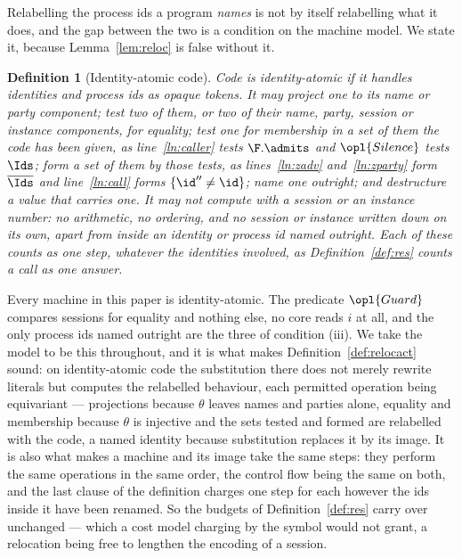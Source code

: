 \documentclass[10pt,oneside,openany]{book}
\theoremstyle{accentdef}
\newtheorem{definition}{Definition}[chapter]
\theoremstyle{accentplain}
\begin{document}
Relabelling the process ids a program \emph{names} is not by itself relabelling what it does, and
the gap between the two is a condition on the machine model. We state it, because
Lemma~\ref{lem:reloc} is false without it.

\begin{definition}[Identity-atomic code]\label{def:atomic}
Code is \emph{identity-atomic} if it handles identities and process ids as opaque tokens. It may
project one to its name or party component; test two of them, or two of their name, party, session or
instance components, for equality; test one for membership in a set of them the code has been given,
as line~\ref{ln:caller} tests $\F.\admits$ and $\opl{Silence}$ tests $\Ids$; form a set of them by
those tests, as lines~\ref{ln:zadv} and~\ref{ln:zparty} form $\overline{\Ids}$ and
line~\ref{ln:call} forms $\{\id'' \neq \id\}$; name one outright; and
destructure a value that carries one. It may not compute with a session or an instance number: no
arithmetic, no ordering, and no session or instance written down on its own, apart from inside an
identity or process id named outright. Each of these counts as one step, whatever the identities
involved, as Definition~\ref{def:res} counts a call as one answer.
\end{definition}

Every machine in this paper is identity-atomic. The predicate $\opl{Guard}$ compares sessions for equality and
nothing else, no core reads $i$ at all, and the only process ids named outright are the three of
condition (iii). We take the model to be this throughout, and it is what makes
Definition~\ref{def:relocact} sound: on identity-atomic code the substitution there does not merely
rewrite literals but computes the relabelled behaviour, each permitted operation being equivariant
--- projections because $\theta$ leaves names and parties alone, equality and membership because
$\theta$ is injective and the sets tested and formed are relabelled with the code, a named identity
because substitution replaces it by its image. It is also what makes a
machine and its image take the same steps: they perform the same operations in the same order, the
control flow being the same on both, and the last clause of the definition charges one step for each
however the ids inside it have been renamed. So the budgets of Definition~\ref{def:res} carry over
unchanged --- which a cost model charging by the symbol would not grant, a relocation being free to
lengthen the encoding of a session.
\end{document}
